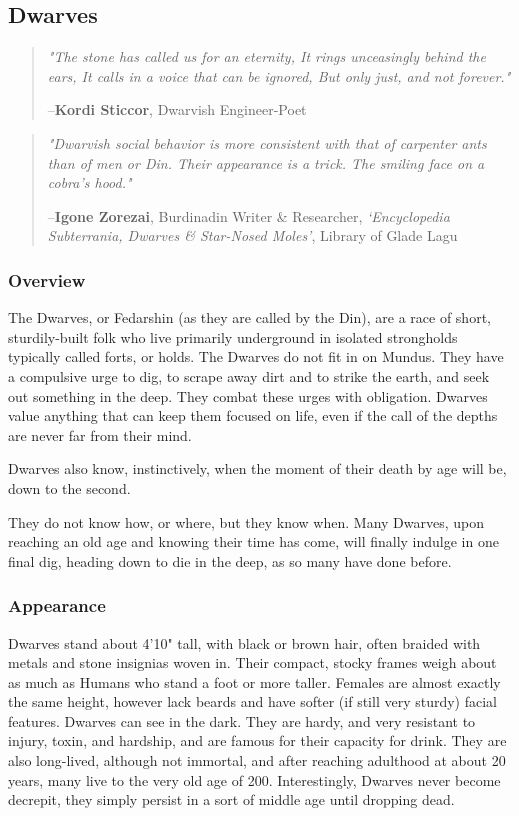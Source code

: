 \documentclass[oneside,11pt,english]{book}
\begin{document}
\subsection{Dwarves}\label{sec:dwarves}
\begin{quotation}
  \emph{"The stone has called us for an eternity, It rings unceasingly behind
    the ears, It calls in a voice that can be ignored, But only just, and not
    forever."}

  \hfill--\textbf{Kordi Sticcor}, Dwarvish Engineer-Poet 
\end{quotation}
\begin{quotation}
  \emph{"Dwarvish social behavior is more consistent with that of carpenter ants
    than of men or Din. Their appearance is a trick. The smiling face on a
    cobra's hood."}

  \hfill --\textbf{Igone Zorezai}, Burdinadin Writer \& Researcher,
  \textit{‘Encyclopedia Subterrania, Dwarves \& Star-Nosed Moles’}, Library of
  Glade Lagu
\end{quotation}
\subsubsection*{Overview} 
The Dwarves, or Fedarshin (as they are called by the Din), are a race of short,
sturdily-built folk who live primarily underground in isolated strongholds
typically called forts, or holds. The Dwarves do not fit in on Mundus. They have
a compulsive urge to dig, to scrape away dirt and to strike the earth, and seek
out something in the deep. They combat these urges with obligation. Dwarves
value anything that can keep them focused on life, even if the call of the
depths are never far from their mind.

Dwarves also know, instinctively, when the moment of their death by age will be,
down to the second.

They do not know how, or where, but they know when. Many Dwarves, upon reaching
an old age and knowing their time has come, will finally indulge in one final
dig, heading down to die in the deep, as so many have done before.
\subsubsection*{Appearance} 
Dwarves stand about 4'10" tall, with black or brown hair, often braided with
metals and stone insignias woven in. Their compact, stocky frames weigh about as
much as Humans who stand a foot or more taller. Females are almost exactly the
same height, however lack beards and have softer (if still very sturdy) facial
features. Dwarves can see in the dark. They are hardy, and very resistant to
injury, toxin, and hardship, and are famous for their capacity for drink. They
are also long-lived, although not immortal, and after reaching adulthood at
about 20 years, many live to the very old age of 200. Interestingly, Dwarves
never become decrepit, they simply persist in a sort of middle age until
dropping dead.
\end{document}
